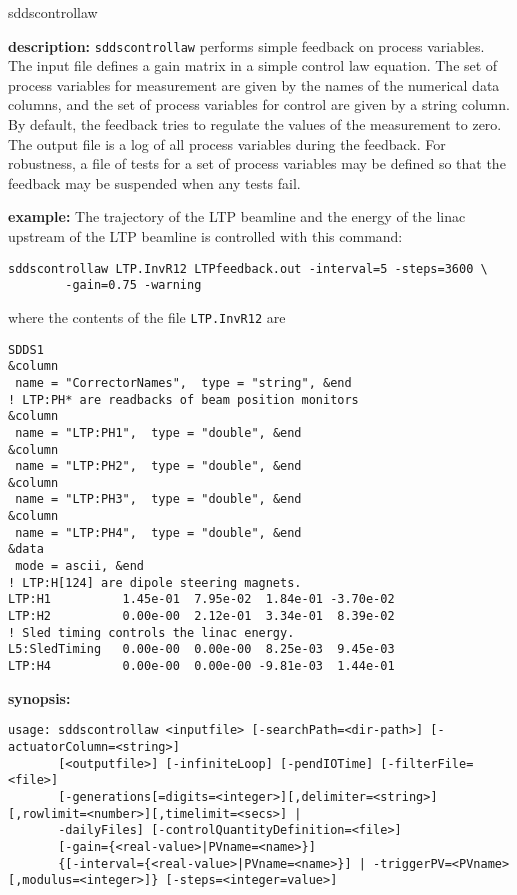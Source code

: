 \begin{sddsprog}{sddscontrollaw}
\item {\bf description:}
\verb+sddscontrollaw+ performs simple feedback on process variables.
The input file defines a gain matrix in a simple control law equation. The set of process variables for
measurement are given by the names of the numerical data columns, and the set
of process variables for control are given by a string column. By default,
the feedback tries to regulate the values of the measurement to zero.
The output file is a log of all process variables during the feedback.
For robustness, a file of tests for a set of process variables may be defined 
so that the feedback may be suspended when any tests fail.

\item {\bf example:} 
% 
The trajectory of the LTP beamline and the energy of the linac upstream of the LTP
beamline is controlled with this command:
\begin{verbatim}
sddscontrollaw LTP.InvR12 LTPfeedback.out -interval=5 -steps=3600 \
        -gain=0.75 -warning
\end{verbatim}
where the contents of the file \verb+LTP.InvR12+ are
\begin{verbatim}
SDDS1
&column
 name = "CorrectorNames",  type = "string", &end
! LTP:PH* are readbacks of beam position monitors
&column
 name = "LTP:PH1",  type = "double", &end
&column             
 name = "LTP:PH2",  type = "double", &end
&column             
 name = "LTP:PH3",  type = "double", &end
&column             
 name = "LTP:PH4",  type = "double", &end
&data
 mode = ascii, &end
! LTP:H[124] are dipole steering magnets.
LTP:H1          1.45e-01  7.95e-02  1.84e-01 -3.70e-02 
LTP:H2          0.00e-00  2.12e-01  3.34e-01  8.39e-02 
! Sled timing controls the linac energy.
L5:SledTiming   0.00e-00  0.00e-00  8.25e-03  9.45e-03 
LTP:H4          0.00e-00  0.00e-00 -9.81e-03  1.44e-01 
\end{verbatim}
\item {\bf synopsis:} 
\begin{verbatim}
usage: sddscontrollaw <inputfile> [-searchPath=<dir-path>] [-actuatorColumn=<string>]
       [<outputfile>] [-infiniteLoop] [-pendIOTime] [-filterFile=<file>]
       [-generations[=digits=<integer>][,delimiter=<string>][,rowlimit=<number>][,timelimit=<secs>] |
       -dailyFiles] [-controlQuantityDefinition=<file>]
       [-gain={<real-value>|PVname=<name>}]
       {[-interval={<real-value>|PVname=<name>}] | -triggerPV=<PVname>[,modulus=<integer>]} [-steps=<integer=value>]

\end{verbatim}
\end{sddsprog}
